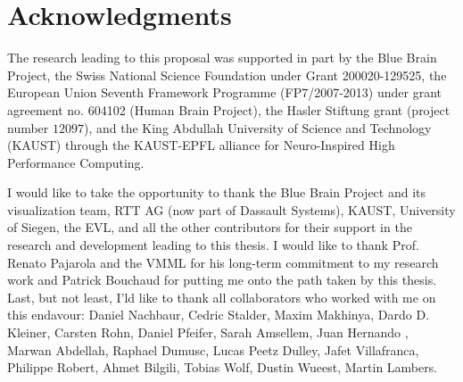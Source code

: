 

\chapter*{Acknowledgments}
The research leading to this proposal was supported in part by the Blue Brain
Project, the Swiss National Science Foundation under Grant 200020-129525, the
European Union Seventh Framework Programme (FP7/2007-2013) under grant agreement
no. 604102 (Human Brain Project), the Hasler Stiftung grant (project number
$12097$), and the King Abdullah University of Science and Technology (KAUST)
through the KAUST-EPFL alliance for Neuro-Inspired High Performance Computing.

I would like to take the opportunity to thank the Blue Brain Project and its
visualization team, RTT AG (now part of Dassault Systems), KAUST, University of
Siegen, the EVL, and all the other contributors for their support in the
research and development leading to this thesis. I would like to thank Prof.
Renato Pajarola and the VMML for his long-term commitment to my research work
and Patrick Bouchaud for putting me onto the path taken by this thesis. Last,
but not least, I'ld like to thank all collaborators who worked with me on this
endavour: Daniel Nachbaur, Cedric Stalder, Maxim Makhinya, Dardo D. Kleiner,
Carsten Rohn, Daniel Pfeifer, Sarah Amsellem, Juan Hernando , Marwan Abdellah,
Raphael Dumusc, Lucas Peetz Dulley, Jafet Villafranca, Philippe Robert, Ahmet
Bilgili, Tobias Wolf, Dustin Wueest, Martin Lambers.